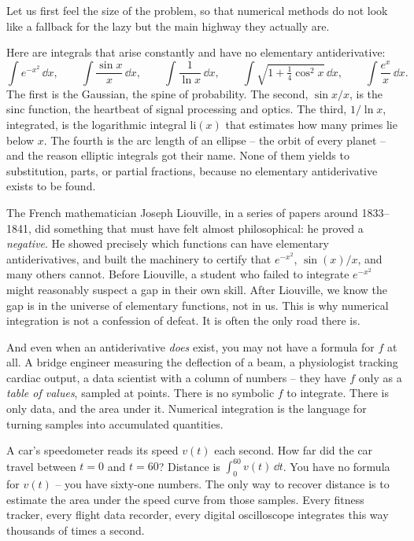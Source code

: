 Let us first feel the size of the problem, so that numerical methods do not look like a fallback for the lazy but the main highway they actually are.

Here are integrals that arise constantly and have no elementary antiderivative:
\[
\int e^{-x^2}\,\dd x,\qquad
\int \frac{\sin x}{x}\,\dd x,\qquad
\int \frac{1}{\ln x}\,\dd x,\qquad
\int \sqrt{1 + \tfrac14\cos^2 x}\,\dd x,\qquad
\int \frac{e^{x}}{x}\,\dd x.
\]
The first is the Gaussian, the spine of probability. The second, $\sin x / x$, is the sinc function, the heartbeat of signal processing and optics. The third, $1/\ln x$, integrated, is the logarithmic integral $\mathrm{li}(x)$ that estimates how many primes lie below $x$. The fourth is the arc length of an ellipse -- the orbit of every planet -- and the reason elliptic integrals got their name. None of them yields to substitution, parts, or partial fractions, because no elementary antiderivative exists to be found.

\begin{historybox}
The French mathematician Joseph Liouville, in a series of papers around 1833--1841, did something that must have felt almost philosophical: he proved a \emph{negative}. He showed precisely which functions can have elementary antiderivatives, and built the machinery to certify that $e^{-x^2}$, $\sin(x)/x$, and many others cannot. Before Liouville, a student who failed to integrate $e^{-x^2}$ might reasonably suspect a gap in their own skill. After Liouville, we know the gap is in the universe of elementary functions, not in us. This is why numerical integration is not a confession of defeat. It is often the only road there is.
\end{historybox}

And even when an antiderivative \emph{does} exist, you may not have a formula for $f$ at all. A bridge engineer measuring the deflection of a beam, a physiologist tracking cardiac output, a data scientist with a column of numbers -- they have $f$ only as a \emph{table of values}, sampled at points. There is no symbolic $f$ to integrate. There is only data, and the area under it. Numerical integration is the language for turning samples into accumulated quantities.

\begin{applicationbox}
A car's speedometer reads its speed $v(t)$ each second. How far did the car travel between $t = 0$ and $t = 60$? Distance is $\int_0^{60} v(t)\,\dd t$. You have no formula for $v(t)$ -- you have sixty-one numbers. The only way to recover distance is to estimate the area under the speed curve from those samples. Every fitness tracker, every flight data recorder, every digital oscilloscope integrates this way thousands of times a second.
\end{applicationbox}

